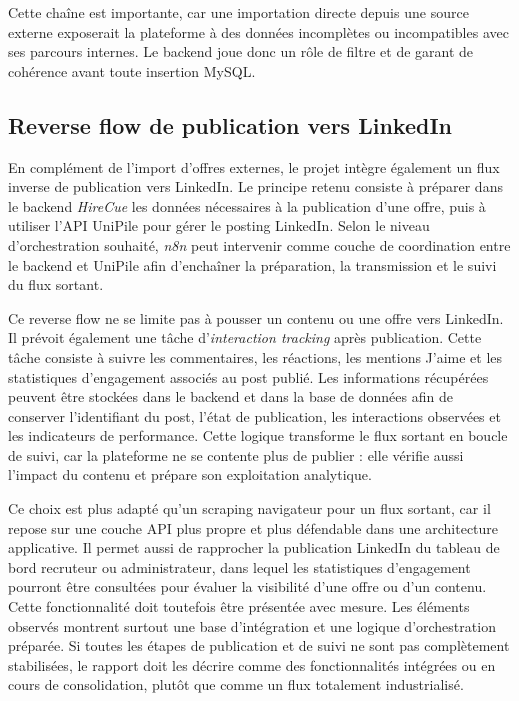 Cette chaîne est importante, car une importation directe depuis une source externe exposerait la plateforme à des données incomplètes ou incompatibles avec ses parcours internes. Le backend joue donc un rôle de filtre et de garant de cohérence avant toute insertion MySQL.

\subsection{Reverse flow de publication vers LinkedIn}

En complément de l'import d'offres externes, le projet intègre également un flux inverse de publication vers LinkedIn. Le principe retenu consiste à préparer dans le backend \textit{HireCue} les données nécessaires à la publication d'une offre, puis à utiliser l'API UniPile pour gérer le posting LinkedIn. Selon le niveau d'orchestration souhaité, \textit{n8n} peut intervenir comme couche de coordination entre le backend et UniPile afin d'enchaîner la préparation, la transmission et le suivi du flux sortant.

Ce reverse flow ne se limite pas à pousser un contenu ou une offre vers LinkedIn. Il prévoit également une tâche d'\textit{interaction tracking} après publication. Cette tâche consiste à suivre les commentaires, les réactions, les mentions J'aime et les statistiques d'engagement associés au post publié. Les informations récupérées peuvent être stockées dans le backend et dans la base de données afin de conserver l'identifiant du post, l'état de publication, les interactions observées et les indicateurs de performance. Cette logique transforme le flux sortant en boucle de suivi, car la plateforme ne se contente plus de publier : elle vérifie aussi l'impact du contenu et prépare son exploitation analytique.

Ce choix est plus adapté qu'un scraping navigateur pour un flux sortant, car il repose sur une couche API plus propre et plus défendable dans une architecture applicative. Il permet aussi de rapprocher la publication LinkedIn du tableau de bord recruteur ou administrateur, dans lequel les statistiques d'engagement pourront être consultées pour évaluer la visibilité d'une offre ou d'un contenu. Cette fonctionnalité doit toutefois être présentée avec mesure. Les éléments observés montrent surtout une base d'intégration et une logique d'orchestration préparée. Si toutes les étapes de publication et de suivi ne sont pas complètement stabilisées, le rapport doit les décrire comme des fonctionnalités intégrées ou en cours de consolidation, plutôt que comme un flux totalement industrialisé.

